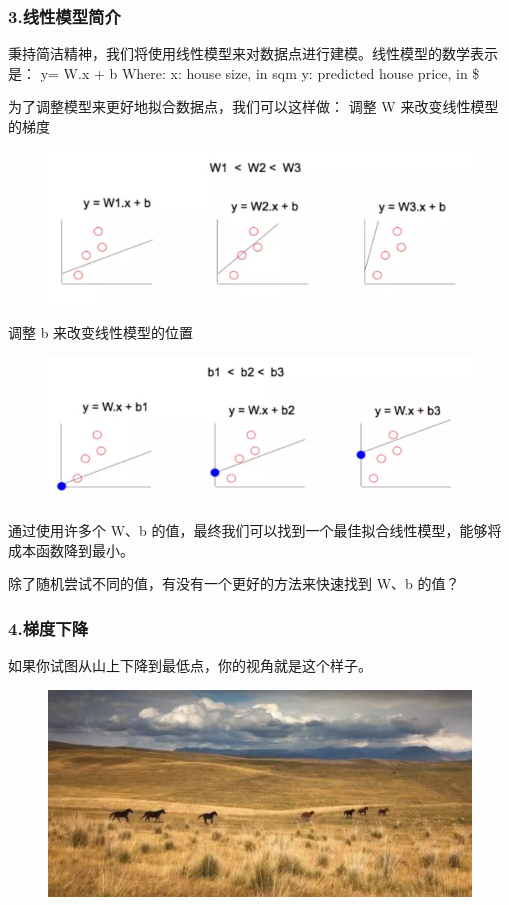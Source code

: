 \documentclass[11pt]{book} %
\begin{document}
\subsubsection{3.线性模型简介}

秉持简洁精神，我们将使用线性模型来对数据点进行建模。线性模型的数学表示是：
  y= W.x + b
  Where:
  x: house size, in sqm
  y: predicted house price, in \$

为了调整模型来更好地拟合数据点，我们可以这样做：
调整 W 来改变线性模型的梯度

\begin{figure}
\centering
\includegraphics[width=0.7\linewidth]{figures/adjust_w}
\caption{}
\label{fig:adjustw}
\end{figure}


调整 b 来改变线性模型的位置

\begin{figure}
\centering
\includegraphics[width=0.7\linewidth]{figures/adjust_b}
\caption{}
\label{fig:adjustb}
\end{figure}


通过使用许多个 W、b 的值，最终我们可以找到一个最佳拟合线性模型，能够将成本函数降到最小。

除了随机尝试不同的值，有没有一个更好的方法来快速找到 W、b 的值？

\subsubsection{4.梯度下降}

如果你试图从山上下降到最低点，你的视角就是这个样子。

\begin{figure}
\centering
\includegraphics[width=0.7\linewidth]{figures/mountain}
\caption{}
\label{fig:mountain}
\end{figure}
\end{document}
